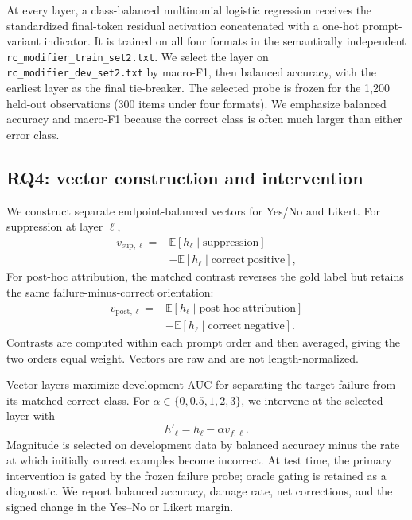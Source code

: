At every layer, a class-balanced multinomial logistic regression receives the standardized final-token residual activation concatenated with a one-hot prompt-variant indicator. It is trained on all four formats in the semantically independent \texttt{rc\_modifier\_train\_set2.txt}. We select the layer on \texttt{rc\_modifier\_dev\_set2.txt} by macro-F1, then balanced accuracy, with the earliest layer as the final tie-breaker. The selected probe is frozen for the 1,200 held-out observations (300 items under four formats). We emphasize balanced accuracy and macro-F1 because the correct class is often much larger than either error class.

\subsection{RQ4: vector construction and intervention}
We construct separate endpoint-balanced vectors for Yes/No and Likert. For suppression at layer $\ell$,
\begin{equation}
\begin{aligned}
 v_{\mathrm{sup},\ell}={}&
 \mathbb E[h_\ell\mid\mathrm{suppression}]\\
 &-\mathbb E[h_\ell\mid\mathrm{correct\ positive}],
\end{aligned}
\end{equation}
For post-hoc attribution, the matched contrast reverses the gold label but retains the same failure-minus-correct orientation:
\begin{equation}
\begin{aligned}
 v_{\mathrm{post},\ell}={}&
 \mathbb E[h_\ell\mid\mathrm{post\mbox{-}hoc\ attribution}]\\
 &-\mathbb E[h_\ell\mid\mathrm{correct\ negative}].
\end{aligned}
\end{equation}
Contrasts are computed within each prompt order and then averaged, giving the two orders equal weight. Vectors are raw and are not length-normalized.

Vector layers maximize development AUC for separating the target failure from its matched-correct class. For $\alpha\in\{0,0.5,1,2,3\}$, we intervene at the selected layer with
\begin{equation}
 h'_\ell=h_\ell-\alpha v_{f,\ell}.
\end{equation}
Magnitude is selected on development data by balanced accuracy minus the rate at which initially correct examples become incorrect. At test time, the primary intervention is gated by the frozen failure probe; oracle gating is retained as a diagnostic. We report balanced accuracy, damage rate, net corrections, and the signed change in the Yes--No or Likert margin.

